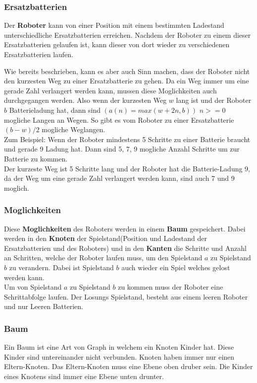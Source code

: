 \documentclass[a4paper,12pt,arial]{scrartcl}
\begin{document}
\subsubsection{Ersatzbatterien}

Der \textbf{Roboter} kann von einer Position mit einem bestimmten Ladestand unterschiedliche Ersatzbatterien erreichen. Nachdem der Roboter zu einem dieser Ersatzbatterien gelaufen ist, kann dieser von dort wieder zu verschiedenen Ersatzbatterien laufen.
\par
Wie bereits beschrieben, kann es aber auch Sinn machen, dass der Roboter nicht den kurzesten Weg zu einer Ersatzbatterie zu gehen. Da ein Weg immer um eine gerade Zahl verlangert werden kann, mussen diese Moglichkeiten auch durchgegangen werden.
Also wenn der kurzesten Weg $w$ lang ist und der Roboter $b$ Batterieladung hat, dann sind $(a(n)  = max(w + 2n, b))$ $n >= 0$ mogliche Langen an Wegen.
So gibt es vom Roboter zu einer Ersatzbatterie $(b - w) / 2$ mogliche Weglangen.
\\
Zum Beispiel:
Wenn der Roboter mindestens 5 Schritte zu einer Batterie braucht und gerade 9 Ladung hat. Dann sind 5, 7, 9 mogliche Anzahl Schritte um zur Batterie zu kommen.
\\
Der kurzeste Weg ist 5 Schritte lang und der Roboter hat die Batterie-Ladung 9, da der Weg um eine gerade Zahl verlangert werden kann, sind auch 7 und 9 moglich.

\subsubsection{Moglichkeiten}

Diese \textbf{Moglichkeiten} des Roboters werden in einem \textbf{Baum} gespeichert.
Dabei werden in den \textbf{Knoten} der Spielstand(Position und Ladestand der Ersatzbatterien und des Roboters) und in den \textbf{Kanten} die Schritte und Anzahl an Schritten, welche der Roboter laufen muss, um den Spielstand $a$ zu Spielstand $b$ zu verandern.
Dabei ist Spielstand $b$ auch wieder ein Spiel welches gelost werden kann.
\\
Um von Spielstand $a$ zu Spielstand $b$ zu kommen muss der Roboter eine Schrittabfolge laufen.
Der Losungs Spielstand, besteht aus einem leeren Roboter und nur Leeren Batterien.


\par
\subsubsection{Baum}
Ein Baum ist eine Art von Graph in welchem ein Knoten Kinder hat. Diese Kinder sind untereinander nicht verbunden.
Knoten haben immer nur einen Eltern-Knoten. Das Eltern-Knoten muss eine Ebene oben druber sein. Die Kinder eines Knotens sind immer eine Ebene unten drunter.
\end{document}
